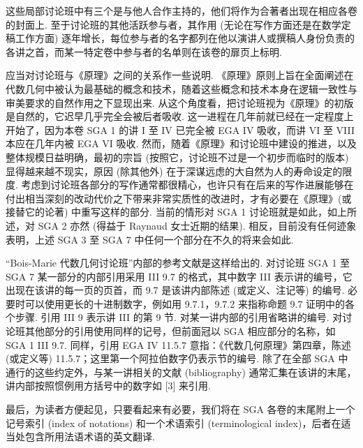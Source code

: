 这些局部讨论班中有三个是与他人合作主持的，他们将作为合著者出现在相应各卷的封面上. 至于讨论班的其他活跃参与者，其作用 (无论在写作方面还是在数学定稿工作方面) 逐年增长，每位参与者的名字都列在他以演讲人或撰稿人身份负责的各讲之首，而某一特定卷中参与者的名单则在该卷的扉页上标明.

应当对讨论班与《原理》之间的关系作一些说明. 《原理》原则上旨在全面阐述在代数几何中被认为最基础的概念和技术，随着这些概念和技术本身在逻辑一致性与审美要求的自然作用之下显现出来. 从这个角度看，把讨论班视为《原理》的初版是自然的，它迟早几乎完全会被后者吸收. 这一进程在几年前就已经在一定程度上开始了，因为本卷 SGA 1 的讲 I 至 IV 已完全被 EGA IV 吸收，而讲 VI 至 VIII 本应在几年内被 EGA VI 吸收. 然而，随着《原理》和讨论班中建设的推进，以及整体规模日益明确，最初的宗旨 (按照它，讨论班不过是一个初步而临时的版本) 显得越来越不现实，原因 (除其他外) 在于深谋远虑的大自然为人的寿命设定的限度. 考虑到讨论班各部分的写作通常都很精心，也许只有在后来的写作进展能够在付出相当深刻的改动代价之下带来非常实质性的改进时，才有必要在《原理》(或接替它的论著) 中重写这样的部分. 当前的情形对 SGA 1 讨论班就是如此，如上所述，对 SGA 2 亦然 (得益于 Raynaud 女士近期的结果). 相反，目前没有任何迹象表明，上述 SGA 3 至 SGA 7 中任何一个部分在不久的将来会如此.

``Bois-Marie 代数几何讨论班''内部的参考文献是这样给出的. 对讨论班 SGA 1 至 SGA 7 某一部分的内部引用采用 III 9.7 的格式，其中数字 III 表示讲的编号，它出现在该讲的每一页的页首，而 9.7 是该讲内部陈述 (或定义、注记等) 的编号. 必要时可以使用更长的十进制数字，例如用 9.7.1，9.7.2 来指称命题 9.7 证明中的各个步骤. 引用 III 9 表示讲 III 的第 9 节. 对某一讲内部的引用省略讲的编号. 对讨论班其他部分的引用使用同样的记号，但前面冠以 SGA 相应部分的名称，如 SGA 1 III 9.7. 同样，引用 EGA IV 11.5.7 意指：《代数几何原理》第四章，陈述 (或定义等) 11.5.7；这里第一个阿拉伯数字仍表示节的编号. 除了在全部 SGA 中通行的这些约定外，与某一讲相关的文献 (bibliography) 通常汇集在该讲的末尾，讲内部按照惯例用方括号中的数字如 [3] 来引用.

最后，为读者方便起见，只要看起来有必要，我们将在 SGA 各卷的末尾附上一个记号索引 (index of notations) 和一个术语索引 (terminological index)，后者在适当处包含所用法语术语的英文翻译.

